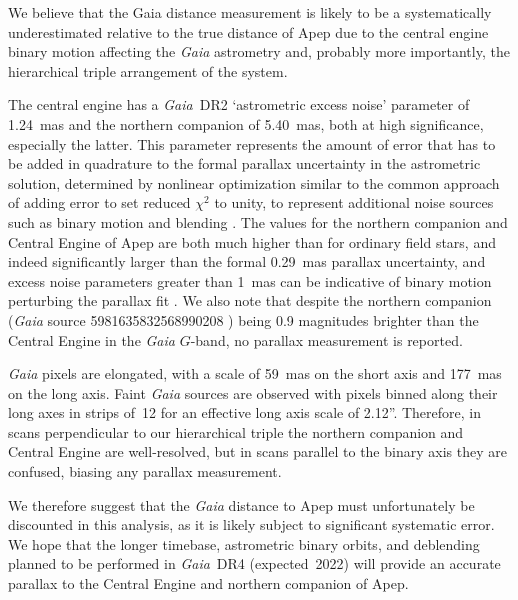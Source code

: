 \documentclass[preprint,times]{aastex61}
\begin{document}
We believe that the Gaia distance measurement is likely to be a systematically underestimated relative to the true distance of Apep due to the central engine binary motion affecting the \emph{Gaia} astrometry and, probably more importantly, the hierarchical triple arrangement of the system. 

The central engine has a \emph{Gaia}~DR2 `astrometric excess noise' parameter  of 1.24~mas and the northern companion of 5.40~mas, both at high significance, especially the latter. This parameter represents the amount of error that has to be added in quadrature to the formal parallax uncertainty in the astrometric solution, determined by nonlinear optimization similar to the common approach of adding error to set reduced $\chi^2$ to unity, to represent additional noise sources such as binary motion and blending \citep{lindegren12}. The values for the northern companion and Central Engine of Apep are both much higher than for ordinary field stars, and indeed significantly larger than the formal 0.29~mas parallax uncertainty, and excess noise parameters greater than 1~mas can be indicative of binary motion perturbing the parallax fit \citep{lindegren18,evans18}. We also note that despite the northern companion (\emph{Gaia} source 5981635832568990208
) being 0.9 magnitudes brighter than the Central Engine in the \emph{Gaia} $G$-band, no parallax measurement is reported.

\emph{Gaia} pixels are elongated, with a scale of 59~mas on the short axis and 177~mas on the long axis. Faint \emph{Gaia} sources are observed with pixels binned along their long axes in strips of~12 for an effective long axis scale of 2.12''. Therefore, in scans perpendicular to our hierarchical triple the northern companion and Central Engine are well-resolved, but in scans parallel to the binary axis they are confused, biasing any parallax measurement.

We therefore suggest that the \emph{Gaia} distance to Apep must unfortunately be discounted in this analysis, as it is likely subject to significant systematic error. We hope that the longer timebase, astrometric binary orbits, and deblending planned to be performed in \emph{Gaia}~DR4 (expected~2022) will provide an accurate parallax to the Central Engine and northern companion of Apep.

\end{document}
